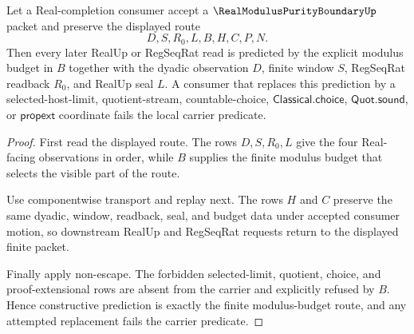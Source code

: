 \begin{theorem}
\label{thm:real-modulus-purity-boundary-constructive-prediction}
Let a Real-completion consumer accept a $\RealModulusPurityBoundaryUp$ packet and preserve the displayed route
$$
D,S,R_0,L,B,H,C,P,N.
$$
Then every later RealUp or RegSeqRat read is predicted by the explicit modulus budget in $B$ together with the dyadic observation $D$, finite window $S$, RegSeqRat readback $R_0$, and RealUp seal $L$. A consumer that replaces this prediction by a selected-host-limit, quotient-stream, countable-choice, $\mathsf{Classical.choice}$, $\mathsf{Quot.sound}$, or $\mathsf{propext}$ coordinate fails the local carrier predicate.
\end{theorem}
\begin{proof}
First read the displayed route. The rows $D,S,R_0,L$ give the four Real-facing observations in order, while $B$ supplies the finite modulus budget that selects the visible part of the route.

Use componentwise transport and replay next. The rows $H$ and $C$ preserve the same dyadic, window, readback, seal, and budget data under accepted consumer motion, so downstream RealUp and RegSeqRat requests return to the displayed finite packet.

Finally apply non-escape. The forbidden selected-limit, quotient, choice, and proof-extensional rows are absent from the carrier and explicitly refused by $B$. Hence constructive prediction is exactly the finite modulus-budget route, and any attempted replacement fails the carrier predicate.
\end{proof}

